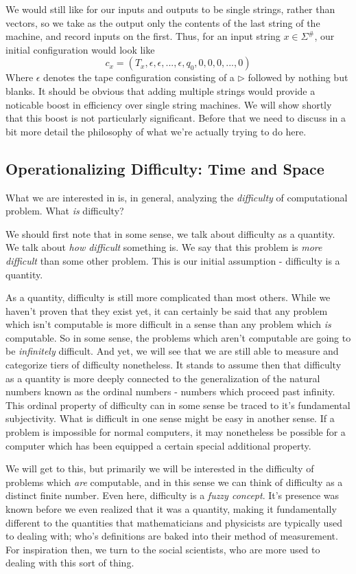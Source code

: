 We would still like for our inputs and outputs to be single strings, rather than vectors, so we take as the output only the contents of the last string of the machine, and record inputs on the first. Thus, for an input string $x\in \Sigma^\#$, our initial configuration would look like
\[c_x=(T_x,\epsilon, \epsilon,...,\epsilon,q_0,0,0,0,...,0) \]
Where $\epsilon$ denotes the tape configuration consisting of a $\triangleright$ followed by nothing but blanks. It should be obvious that adding multiple strings would provide a noticable boost in efficiency over single string machines. We will show shortly that this boost is not particularly significant. Before that we need to discuss in a bit more detail the philosophy of what we're actually trying to do here. 

\subsection{Operationalizing Difficulty: Time and Space}
What we are interested in is, in general, analyzing the \textit{difficulty} of computational problem. What \textit{is} difficulty? 

We should first note that in some sense, we talk about difficulty as a quantity. We talk about \textit{how difficult} something is. We say that this problem is \textit{more difficult} than some other problem. This is our initial assumption - difficulty is a quantity.

As a quantity, difficulty is still more complicated than most others. While we haven't proven that they exist yet, it can certainly be said that any problem which isn't computable is more difficult in a sense than any problem which \textit{is} computable. So in some sense, the problems which aren't computable are going to be \textit{infinitely} difficult. And yet, we will see that we are still able to measure and categorize tiers of difficulty nonetheless. It stands to assume then that difficulty as a quantity is more deeply connected to the generalization of the natural numbers known as the ordinal numbers - numbers which proceed past infinity. This ordinal property of difficulty can in some sense be traced to it's fundamental subjectivity. What is difficult in one sense might be easy in another sense. If a problem is impossible for normal computers, it may nonetheless be possible for a computer which has been equipped a certain special additional property. 

We will get to this, but primarily we will be interested in the difficulty of problems which \textit{are} computable, and in this sense we can think of difficulty as a distinct finite number. Even here, difficulty is a \textit{fuzzy concept}. It's presence was known before we even realized that it was a quantity, making it fundamentally different to the quantities that mathematicians and physicists are typically used to dealing with; who's definitions are baked into their method of measurement. For inspiration then, we turn to the social scientists, who are more used to dealing with this sort of thing. 

